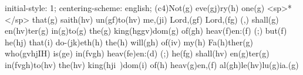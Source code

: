 initial-style: 1;
centering-scheme: english;
(c4)Not(g) eve(gj)ry(h) one(g) <sp>*</sp> that(g) saith(hv) un(gf)to(hv) me,(ji) Lord,(gf) Lord,(fg) (,) shall(g) en(hv)ter(g) in(g)to(g) the(g) king(hggv)dom(g) of(gh) heav(f)en:(f) (;) but(f) he(hj) that(i) do-(jk)eth(h) the(h) will(gh) of(iv) my(h) Fa(h)ther(g) who(gvhjIH) is(ge) in(fvgh) heav(fe)en:(d) (;) he(fg) shall(hv) en(g)ter(g) in(fvgh)to(hv) the(hv) king(hji~)dom(i) of(h) heav(g)en,(f) al(gh)le(hv)lu(g)ia.(g)
